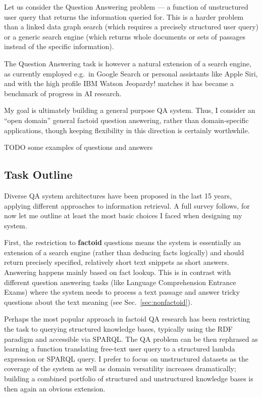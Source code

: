 Let us consider the Question Answering problem --- a function of
unstructured user query that returns the information queried for.
This is a harder problem than a linked data graph search (which requires
a precisely structured user query) or a generic search engine (which
returns whole documents or sets of passages instead of the specific
information).

The Question Answering task is however a natural extension of a search
engine, as currently employed e.g.\ in Google Search \cite{googleKG}
or personal assistants like Apple Siri, and with the high
profile IBM Watson Jeopardy! matches \cite{WatsonOverview}
it has became a benchmark of progress in AI research.

My goal is ultimately building a general purpose QA system.
Thus, I consider an ``open domain'' general factoid question answering,
rather than domain-specific applications, though keeping flexibility
in this direction is certainly worthwhile.

TODO some examples of questions and answers

\subsection{Task Outline}

Diverse QA system architectures have been proposed in the last 15 years,
applying different approaches to information retrieval.  A full survey
follows, for now let me outline at least the most basic choices I faced
when designing my system.

First, the restriction to \textbf{factoid} questions means the system
is essentially an extension of a search engine (rather than deducing
facts logically) and should return precisely specified, relatively short
text snippets as short answers.  Answering happens mainly based on fact
lookup.  This is in contrast with different question answering tasks
(like Language Comprehension Entrance Exams) where the system needs to
process a text passage and answer tricky questions about the text meaning
(see Sec.~\ref{sec:nonfactoid}).

Perhaps the most popular approach in factoid QA research has been restricting
the task to querying structured knowledge bases, typically using the
RDF paradigm and accessible via SPARQL\@.  The QA problem can
be then rephrased as learning a function translating free-text user query
to a structured lambda expression or SPARQL query. \cite{Semantic2013Berant, Semantic2014Bordes}
I prefer to focus on unstructured datasets as the coverage of the system
as well as domain versatility increases dramatically; building a combined
portfolio of structured and unstructured knowledge bases
is then again an obvious extension.

